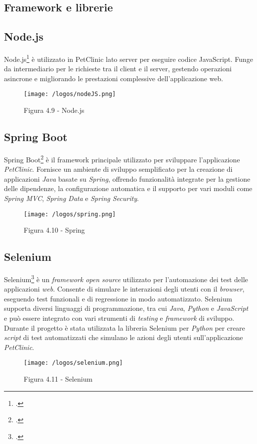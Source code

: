 \newpage
\subsection{Framework e librerie}
\subsection*{Node.js}
Node.js\footcite{site:nodejs} è utilizzato in PetClinic lato server per eseguire codice JavaScript. Funge da intermediario per le richieste tra il client e il server, gestendo operazioni asincrone e migliorando le prestazioni complessive dell'applicazione web.
\begin{figure}[H] 
    \centering 
    \texttt{[image: /logos/nodeJS.png]} 
    \caption{Figura 4.9 - Node.js}
\end{figure}

\vspace{1em}

\subsection*{Spring Boot}
Spring Boot\footcite{site:spring} è il framework principale utilizzato per sviluppare l'applicazione \emph{PetClinic}. Fornisce un ambiente di sviluppo semplificato per la creazione di applicazioni \emph{Java} basate su \emph{Spring}, offrendo funzionalità integrate per la gestione delle dipendenze, la configurazione automatica e il supporto per vari moduli come \emph{Spring MVC}, \emph{Spring Data} e \emph{Spring Security}.
\begin{figure}[H] 
    \centering 
    \texttt{[image: /logos/spring.png]} 
    \caption{Figura 4.10 - Spring}
\end{figure}

\vspace{1em}

\subsection*{Selenium}
Selenium\footcite{site:selenium} è un \emph{framework open source} utilizzato per l'automazione dei test delle applicazioni \emph{web}. Consente di simulare le interazioni degli utenti con il \emph{browser}, eseguendo test funzionali e di regressione in modo automatizzato. Selenium supporta diversi linguaggi di programmazione, tra cui \emph{Java}, \emph{Python} e \emph{JavaScript} e può essere integrato con vari strumenti di \emph{testing} e \emph{framework} di sviluppo. Durante il progetto è stata utilizzata la libreria Selenium per \emph{Python} per creare \emph{script} di test automatizzati che simulano le azioni degli utenti sull'applicazione \emph{PetClinic}.
\begin{figure}[H] 
    \centering 
    \texttt{[image: /logos/selenium.png]} 
    \caption{Figura 4.11 - Selenium}
\end{figure}


